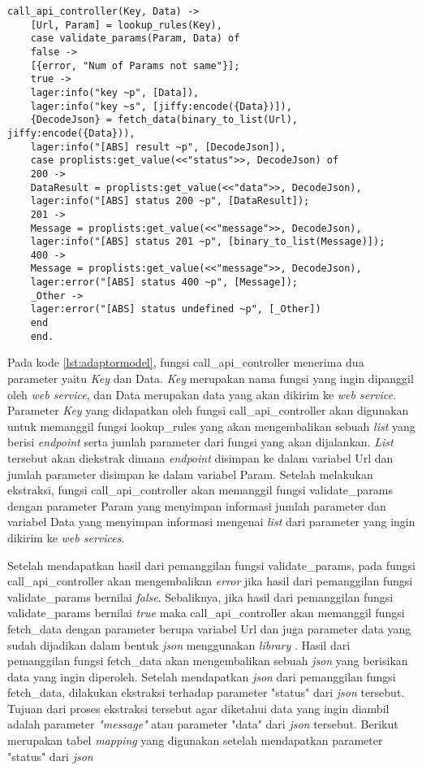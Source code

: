 \begin{minipage}{\linewidth}
	\begin{lstlisting}[caption={Implementasi fungsi untuk pemanggilan \textit{adaptor} dari model},label={lst:adaptormodel}]
	call_api_controller(Key, Data) ->
	[Url, Param] = lookup_rules(Key),
	case validate_params(Param, Data) of
	false ->
	[{error, "Num of Params not same"}];
	true ->
	lager:info("key ~p", [Data]),
	lager:info("key ~s", [jiffy:encode({Data})]),
	{DecodeJson} = fetch_data(binary_to_list(Url), jiffy:encode({Data})),
	lager:info("[ABS] result ~p", [DecodeJson]),
	case proplists:get_value(<<"status">>, DecodeJson) of
	200 ->
	DataResult = proplists:get_value(<<"data">>, DecodeJson),
	lager:info("[ABS] status 200 ~p", [DataResult]);
	201 ->
	Message = proplists:get_value(<<"message">>, DecodeJson),
	lager:info("[ABS] status 201 ~p", [binary_to_list(Message)]);
	400 ->
	Message = proplists:get_value(<<"message">>, DecodeJson),
	lager:error("[ABS] status 400 ~p", [Message]);
	_Other -> 
	lager:error("[ABS] status undefined ~p", [_Other])
	end  
	end.
	\end{lstlisting}
\end{minipage}

Pada kode \ref{lst:adaptormodel}, fungsi call\_api\_controller menerima dua parameter yaitu \textit{Key} dan Data. \textit{Key} merupakan nama fungsi yang ingin dipanggil oleh \textit{web service}, dan Data merupakan data yang akan dikirim ke \textit{web service}. Parameter \textit{Key} yang didapatkan oleh fungsi call\_api\_controller akan digunakan untuk memanggil fungsi lookup\_rules yang akan mengembalikan sebuah \textit{list} yang berisi \textit{endpoint} serta jumlah parameter dari fungsi yang akan dijalankan. \textit{List} tersebut akan diekstrak dimana \textit{endpoint} disimpan ke dalam variabel Url dan jumlah parameter disimpan ke dalam variabel Param. Setelah melakukan ekstraksi, fungsi call\_api\_controller akan memanggil fungsi validate\_params dengan parameter Param yang menyimpan informasi jumlah parameter dan variabel Data yang menyimpan informasi mengenai \textit{list} dari parameter yang ingin dikirim ke \textit{web services}.

Setelah mendapatkan hasil dari pemanggilan fungsi validate\_params, pada fungsi call\_api\_controller akan mengembalikan \textit{error} jika hasil dari pemanggilan fungsi validate\_params bernilai \textit{false}. Sebaliknya, jika hasil dari pemanggilan fungsi validate\_params bernilai \textit{true} maka call\_api\_controller akan memanggil fungsi fetch\_data dengan parameter berupa variabel Url dan juga parameter data yang sudah dijadikan dalam bentuk \textit{json} menggunakan \textit{library} . Hasil dari pemanggilan fungsi fetch\_data akan mengembalikan sebuah \textit{json} yang berisikan data yang ingin diperoleh. Setelah mendapatkan \textit{json} dari pemanggilan fungsi fetch\_data, dilakukan ekstraksi terhadap parameter "status" dari \textit{json} tersebut. Tujuan dari proses ekstraksi tersebut agar diketahui data yang ingin diambil adalah parameter \textit{"message"} atau parameter "data" dari \textit{json} tersebut. Berikut merupakan tabel \textit{mapping} yang digunakan setelah mendapatkan parameter "status" dari \textit{json}

